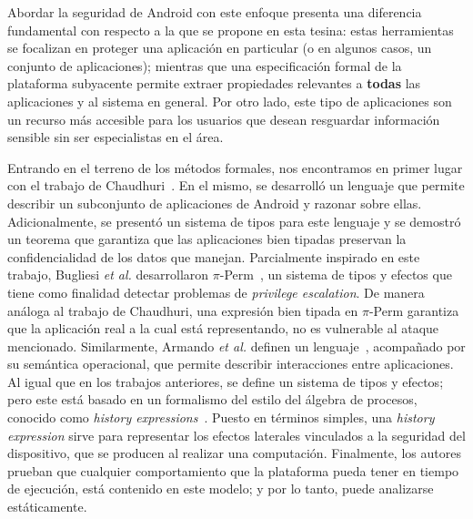 Abordar la seguridad de Android con este enfoque presenta una diferencia fundamental con respecto a
la que se propone en esta tesina: estas herramientas se focalizan en proteger una aplicación en
particular (o en algunos casos, un conjunto de aplicaciones); mientras que una especificación formal
de la plataforma subyacente permite extraer propiedades relevantes a \textbf{todas} las aplicaciones
y al sistema en general. Por otro lado, este tipo de aplicaciones son un recurso más accesible para
los usuarios que desean resguardar información sensible sin ser especialistas en el área.





Entrando en el terreno de los métodos formales, nos encontramos en primer lugar con el trabajo de
Chaudhuri~\cite{chaudhuri}. En el mismo, se desarrolló un lenguaje que permite describir un
subconjunto de aplicaciones de Android y razonar sobre ellas. Adicionalmente, se presentó un sistema
de tipos para este lenguaje y se demostró un teorema que garantiza que las aplicaciones bien tipadas
preservan la confidencialidad de los datos que manejan. Parcialmente inspirado en este trabajo,
Bugliesi \textit{et al.} desarrollaron $\pi$-Perm~\cite{bugliesi}, un sistema de tipos y efectos que
tiene como finalidad detectar problemas de \textit{privilege escalation}. De manera análoga al
trabajo de Chaudhuri, una expresión bien tipada en $\pi$-Perm garantiza que la aplicación real a la
cual está representando, no es vulnerable al ataque mencionado. Similarmente, Armando \textit{et
    al.} definen un lenguaje~\cite{armando}, acompañado por su semántica operacional, que permite
describir interacciones entre aplicaciones. Al igual que en los trabajos anteriores, se define un
sistema de tipos y efectos; pero este está basado en un formalismo del estilo del álgebra de
procesos, conocido como \textit{history expressions}~\cite{history-expressions}. Puesto en términos
simples, una \textit{history expression} sirve para representar los efectos laterales vinculados a
la seguridad del dispositivo, que se producen al realizar una computación. Finalmente, los autores
prueban que cualquier comportamiento que la plataforma pueda tener en tiempo de ejecución, está
contenido en este modelo; y por lo tanto, puede analizarse estáticamente.

